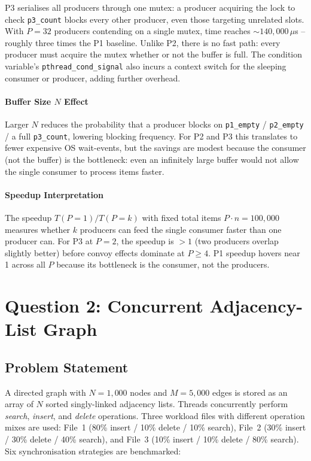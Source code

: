 \documentclass{article}
\begin{document}
P3 serialises all producers through one mutex: a producer acquiring the
lock to check \texttt{p3\_count} blocks every other producer, even those
targeting unrelated slots. With $P=32$ producers contending on a single
mutex, time reaches $\sim140{,}000\,\mu$s -- roughly three times the P1
baseline. Unlike P2, there is no fast path: every producer must acquire
the mutex whether or not the buffer is full. The condition variable's
\texttt{pthread\_cond\_signal} also incurs a context switch for the
sleeping consumer or producer, adding further overhead.

\paragraph{Buffer Size $N$ Effect}

Larger $N$ reduces the probability that a producer blocks on
\texttt{p1\_empty} / \texttt{p2\_empty} / a full \texttt{p3\_count},
lowering blocking frequency. For P2 and P3 this translates to fewer
expensive OS wait-events, but the savings are modest because the consumer
(not the buffer) is the bottleneck: even an infinitely large buffer would
not allow the single consumer to process items faster.

\paragraph{Speedup Interpretation}

The speedup $T(P=1)/T(P=k)$ with fixed total items $P \cdot n = 100{,}000$
measures whether $k$ producers can feed the single consumer faster than
one producer can. For P3 at $P=2$, the speedup is $> 1$ (two producers
overlap slightly better) before convoy effects dominate at $P \geq 4$.
P1 speedup hovers near 1 across all $P$ because its bottleneck is the
consumer, not the producers.

\newpage

\section{Question 2: Concurrent Adjacency-List Graph}

\subsection{Problem Statement}

A directed graph with $N = 1{,}000$ nodes and $M = 5{,}000$ edges is
stored as an array of $N$ sorted singly-linked adjacency lists. Threads
concurrently perform \textit{search}, \textit{insert}, and \textit{delete}
operations. Three workload files with different operation mixes are used:
File~1 (80\% insert / 10\% delete / 10\% search),
File~2 (30\% insert / 30\% delete / 40\% search), and
File~3 (10\% insert / 10\% delete / 80\% search).
Six synchronisation strategies are benchmarked:
\end{document}
